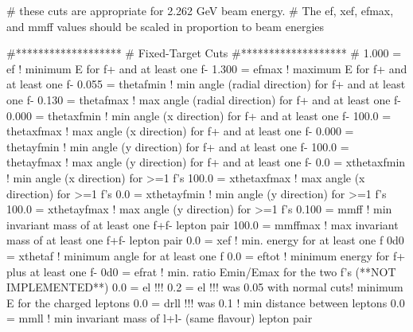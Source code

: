 # these cuts are appropriate for 2.262 GeV beam energy.  
# The ef, xef, efmax, and mmff values should be scaled in proportion to beam energies


#*******************                                                 
# Fixed-Target Cuts
#*******************
#
 1.000 = ef        ! minimum E for f+ and at least one f-
 1.300 = efmax     ! maximum E for f+ and at least one f-
 0.055 = thetafmin ! min angle (radial direction) for f+ and at least one f-
 0.130 = thetafmax ! max angle (radial direction) for f+ and at least one f-
 0.000 = thetaxfmin ! min angle (x direction) for f+ and at least one f-
 100.0 = thetaxfmax ! max angle (x direction) for f+ and at least one f-
 0.000 = thetayfmin ! min angle (y direction) for f+ and at least one f-
 100.0 = thetayfmax ! max angle (y direction) for f+ and at least one f-
 0.0 = xthetaxfmin ! min angle (x direction) for >=1 f's
 100.0 = xthetaxfmax ! max angle (x direction) for >=1 f's
 0.0 = xthetayfmin ! min angle (y direction) for >=1 f's
 100.0 = xthetayfmax ! max angle (y direction) for >=1 f's
 0.100 = mmff      ! min invariant mass of at least one f+f- lepton pair
 100.0 = mmffmax  ! max invariant mass of at least one f+f- lepton pair
 0.0 = xef       ! min. energy for at least one f
 0d0 = xthetaf   ! minimum angle for at least one f
 0.0 = eftot     ! minimum energy for f+ plus at least one f-
 0d0 = efrat     ! min. ratio Emin/Emax for the two f's (**NOT IMPLEMENTED**)
 0.0  = el     !!! 0.2 = el  !!! was 0.05 with normal cuts! minimum E for the charged leptons
 0.0  = drll  !!! was 0.1  ! min distance between leptons
 0.0  = mmll    ! min invariant mass of l+l- (same flavour) lepton pair



